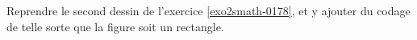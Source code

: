 
\begin{exercice}\label{exo2smath-0179}

    Reprendre le second dessin de l'exercice \ref{exo2smath-0178}, et y ajouter du codage de telle sorte que la figure soit un rectangle.

\end{exercice}
